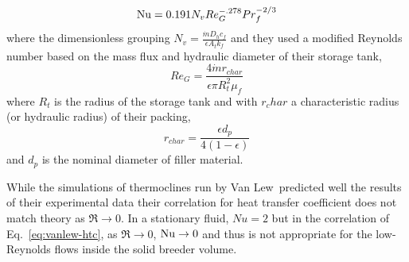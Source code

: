 

\begin{equation}\label{eq:vanlew-htc}
	\mathrm{Nu} =0.191 N_v Re_G^{-.278} Pr_f^{-2/3}
\end{equation}
where the dimensionless grouping $N_v = \frac{\dot{m}D_hc_f}{\epsilon A_tk_f}$ and they used a modified Reynolds number based on the mass flux and hydraulic diameter of their storage tank,
\begin{equation}
	Re_G=\frac{4 \dot{m} r_{char}}{\epsilon \pi R_t^2\mu_f}
\end{equation}
where $R_t$ is the radius of the storage tank and with $r_char$ a characteristic radius (or hydraulic radius) of their packing, 
\begin{equation}
	r_{char}=\frac{\epsilon d_p}{4(1-\epsilon)}
\end{equation}
and $d_p$ is the nominal diameter of filler material.

While the simulations of thermoclines run by Van Lew\etal~predicted well the results of their experimental data\cite{vanlew133,Valmiki2012a} their correlation for heat transfer coefficient does not match theory as $\Re \rightarrow 0$. In a stationary fluid, $Nu = 2$ but in the correlation of Eq.~\ref{eq:vanlew-htc}, as $\Re \rightarrow 0$, $\mathrm{Nu} \rightarrow0$ and thus is not appropriate for the low-Reynolds flows inside the solid breeder volume.









